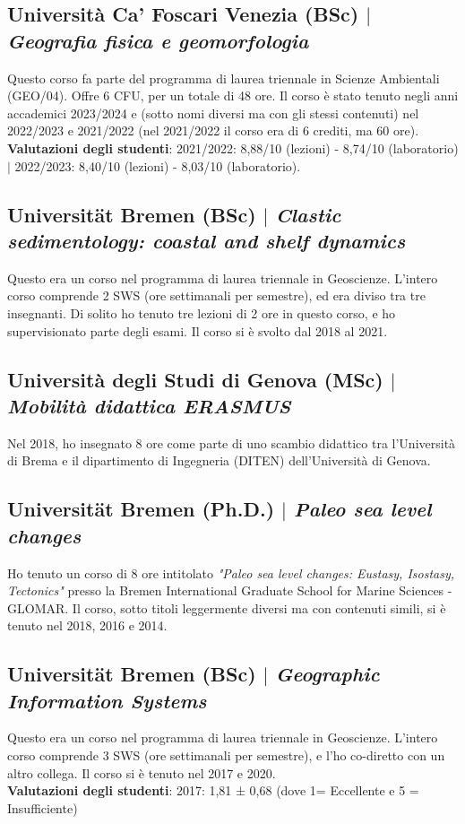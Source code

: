 \documentclass[11pt]{article}
\begin{document}
\subsection{Università Ca' Foscari Venezia (BSc) $|$ {\normalfont\textit{Geografia fisica e geomorfologia}}}
{\footnotesize Questo corso fa parte del programma di laurea triennale in Scienze Ambientali (GEO/04). Offre 6 CFU, per un totale di 48 ore. Il corso è stato tenuto negli anni accademici 2023/2024 e (sotto nomi diversi ma con gli stessi contenuti) nel 2022/2023 e 2021/2022 (nel 2021/2022 il corso era di 6 crediti, ma 60 ore).\\
\textbf{Valutazioni degli studenti}: 
2021/2022: 8,88/10 (lezioni) - 8,74/10 (laboratorio) $|$
2022/2023: 8,40/10 (lezioni) - 8,03/10 (laboratorio).}
\bigskip

\subsection{Universität Bremen (BSc) $|$ {\normalfont\textit{Clastic sedimentology: coastal and shelf dynamics}}}
{\footnotesize Questo era un corso nel programma di laurea triennale in Geoscienze. L'intero corso comprende 2 SWS (ore settimanali per semestre), ed era diviso tra tre insegnanti. Di solito ho tenuto tre lezioni di 2 ore in questo corso, e ho supervisionato parte degli esami. Il corso si è svolto dal 2018 al 2021.}
\bigskip

\subsection{Università degli Studi di Genova (MSc) $|$ {\normalfont\textit{Mobilità didattica ERASMUS}}}
{\footnotesize Nel 2018, ho insegnato 8 ore come parte di uno scambio didattico tra l'Università di Brema e il dipartimento di Ingegneria (DITEN) dell'Università di Genova.}
\bigskip

\subsection{Universität Bremen (Ph.D.) $|$ {\normalfont\textit{Paleo sea level changes}}}
{\footnotesize Ho tenuto un corso di 8 ore intitolato \textit{"Paleo sea level changes: Eustasy, Isostasy, Tectonics"} presso la Bremen International Graduate School for Marine Sciences - GLOMAR. Il corso, sotto titoli leggermente diversi ma con contenuti simili, si è tenuto nel 2018, 2016 e 2014.}
\bigskip

\subsection{Universität Bremen (BSc) $|$ {\normalfont\textit{Geographic Information Systems}}}
{\footnotesize Questo era un corso nel programma di laurea triennale in Geoscienze. L'intero corso comprende 3 SWS (ore settimanali per semestre), e l'ho co-diretto con un altro collega. Il corso si è tenuto nel 2017 e 2020.\\
\textbf{Valutazioni degli studenti}: 2017: 1,81 ± 0,68 (dove 1= Eccellente e 5 = Insufficiente)}
\bigskip
\end{document}
